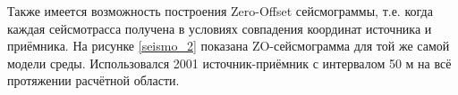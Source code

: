\documentclass{article}
\begin{document}
\noindent
\begin{minipage}{\linewidth}
\label{seismo_1}
\end{minipage}

Также имеется возможность построения Zero-Offset сейсмограммы, т.е. когда каждая сейсмотрасса получена в условиях совпадения координат источника и приёмника.
На рисунке \ref{seismo_2} показана ZO-сейсмограмма для той же самой модели среды.
Использовался 2001 источник-приёмник с интервалом 50 м на всё протяжении расчётной области.

\noindent
\begin{minipage}{\linewidth}
\label{seismo_2}
\end{minipage}
\end{document}
